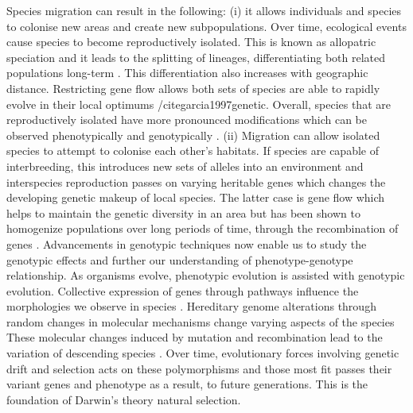 Species migration can result in the following: (i) it allows individuals and species to colonise new areas and create new subpopulations. Over time, ecological events cause species to become reproductively isolated. This is known as allopatric speciation and it leads to the splitting of lineages, differentiating both related populations long-term \cite{barber1999patterns,coyne1992genetics}. This differentiation also increases with geographic distance. Restricting gene flow allows both sets of species are able to rapidly evolve in their local optimums /cite{garcia1997genetic}. Overall, species that are reproductively isolated have more pronounced modifications which can be observed phenotypically and genotypically \cite{pongratz2002genetic,sato2006effect}. (ii) Migration can allow isolated species to attempt to colonise each other’s habitats. If species are capable of interbreeding, this introduces new sets of alleles into an environment and interspecies reproduction passes on varying heritable genes which changes the developing genetic makeup of local species. The latter case is gene flow which helps to maintain the genetic diversity in an area but has been shown to homogenize populations over long periods of time, through the recombination of genes \cite{sato2006effect}. Advancements in genotypic techniques now enable us to study the genotypic effects and further our understanding of phenotype-genotype relationship. As organisms evolve, phenotypic evolution is assisted with genotypic evolution. Collective expression of genes through pathways influence the morphologies we observe in species \cite{hinman2009evolution}. Hereditary genome alterations through random changes in molecular mechanisms change varying aspects of the species \cite{chandrasekaran2008origins} These molecular changes induced by mutation and recombination lead to the variation of descending species \cite{chandrasekaran2008origins,ohno1999gene,brown2002genomes}. Over time, evolutionary forces involving genetic drift and selection acts on these polymorphisms and those most fit passes their variant genes and phenotype as a result, to future generations. This is the foundation of Darwin’s theory natural selection.\\
